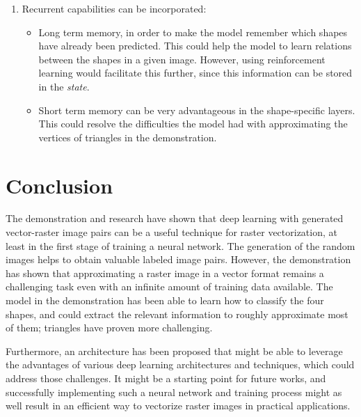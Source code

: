 \documentclass[12pt, a4paper, titlepage]{report}
\begin{document}
\begin{enumerate}[label=\Roman*.]
   \item Recurrent capabilities can be incorporated:
      \begin{itemize}
         \item Long term memory, in order to make the model remember which shapes have already been predicted. This could help the model to learn relations between the shapes in a given image. However, using reinforcement learning would facilitate this further, since this information can be stored in the \emph{state}.
         \item Short term memory can be very advantageous in the shape-specific layers. This could resolve the difficulties the model had with approximating the vertices of triangles in the demonstration.
      \end{itemize}
\end{enumerate}


\pagebreak
\section{Conclusion}

The demonstration and research have shown that deep learning with generated vector-raster image pairs can be a useful technique for raster vectorization, at least in the first stage of training a neural network. The generation of the random images helps to obtain valuable labeled image pairs.
However, the demonstration has shown that approximating a raster image in a vector format remains a challenging task even with an infinite amount of training data available. The model in the demonstration has been able to learn how to classify the four shapes, and could extract the relevant information to roughly approximate most of them; triangles have proven more challenging.

Furthermore, an architecture has been proposed that might be able to leverage the advantages of various deep learning architectures and techniques, which could address those challenges. It might be a starting point for future works, and successfully implementing such a neural network and training process might as well result in an efficient way to vectorize raster images in practical applications.




\end{document}
